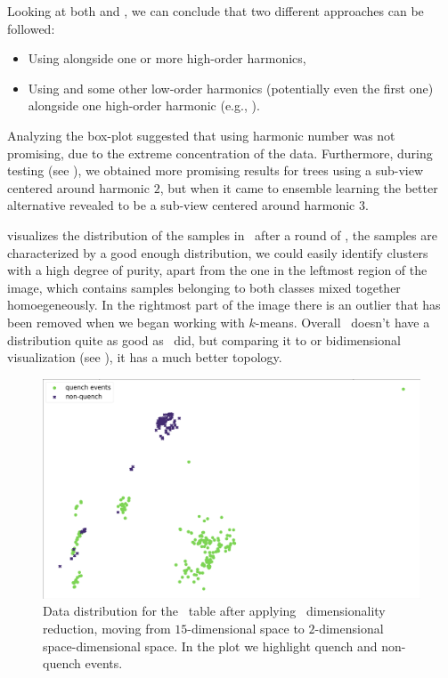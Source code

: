 Looking at both  and , we can conclude that two different
approaches can be followed:
\begin{itemize}
	\item Using \cnmod[2] alongside one or more high-order harmonics,
	\item Using \cnmod[3] and some other low-order harmonics (potentially even the
	      first one) alongside one high-order harmonic (e.g., \cnmod[14]).
\end{itemize}
Analyzing the box-plot suggested that using harmonic number \cnmod[2] was not promising, due to the extreme
concentration of the data. Furthermore, during testing (see ), we obtained more
promising results for trees using a sub-view centered around harmonic $2$, but when it came to
ensemble learning the better alternative revealed to be a sub-view centered around harmonic $3$.

\medskip

 visualizes the distribution of the samples in \cnmod\ after a round of \pca,
the samples are characterized by a good enough distribution, we could easily identify clusters with
a high degree of purity, apart from the one in the leftmost region of the image, which contains
samples belonging to both classes mixed together homoegeneously. In the rightmost part of the image
there is an outlier that has been removed when we began working with $k$-means. Overall \cnmod\
doesn't have a distribution quite as good as \an\ did, but comparing it to  or
\phin bidimensional visualization (see \Cref{fig:phi-dist}), it has a much better topology.
\begin{figure}[!ht]
	\centering
	\includegraphics[width=0.7\linewidth]{img/Cnmod_distribution.png}
	\caption{Data distribution for the \cnmod\ table after applying \pca\ dimensionality
		reduction, moving from $15$-dimensional space to $2$-dimensional space-dimensional
		space. In the plot we highlight quench and non-quench events.} \label{fig:cnmod-dist}
\end{figure}

